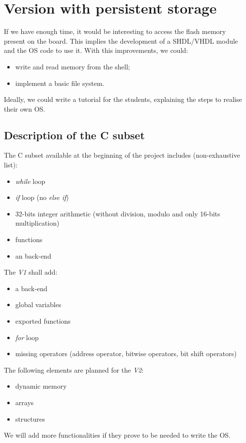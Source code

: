 \documentclass{article}
\begin{document}
    \section{Version with persistent storage}
      If we have enough time, it would be interesting to access the flash memory
      present on the board. This implies the development of a SHDL/VHDL module
      and the OS code to use it. With this improvements, we could:
      \begin{itemize}
        \item write and read memory from the shell;
        \item implement a basic file system.
      \end{itemize}
      Ideally, we could write a tutorial for the students, explaining the steps
      to realise their own OS.

  \newpage

  \begin{appendix}
    \section{Description of the C subset}\label{app:C89}
      The C subset available at the beginning of the project includes
      (non-exhaustive list):
      \begin{itemize}
        \item \textit{while} loop
        \item \textit{if} loop (no \textit{else if})
        \item 32-bits integer arithmetic (without division, modulo and only
          16-bits multiplication)
        \item functions
        \item an  back-end
      \end{itemize}

      \noindent The \textit{V1} shall add:
      \begin{itemize}
        \item a  back-end
        \item global variables
        \item exported functions
        \item \textit{for} loop
        \item missing operators (address operator, bitwise operators, bit shift
          operators)
      \end{itemize}

      \noindent The following elements are planned for the \textit{V2}:
      \begin{itemize}
        \item dynamic memory
        \item arrays
        \item structures
      \end{itemize}
      We will add more functionalities if they prove to be needed to write the
      OS. 
  \end{appendix}
\end{document}
